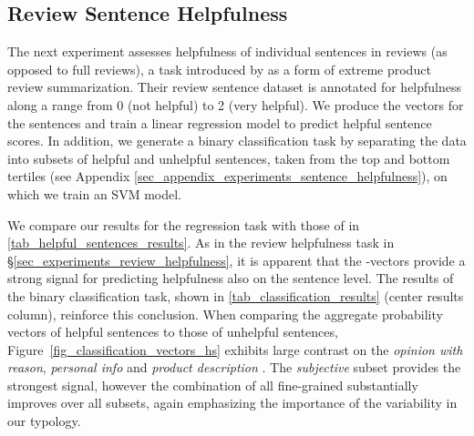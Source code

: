 





\subsection{Review Sentence Helpfulness}
\label{sec_experiments_sentence_helpfulness}

The next experiment assesses helpfulness of individual sentences in reviews (as opposed to full reviews), a task introduced by \citet{gamzu2021helpfulsentences}
as a form of extreme product review summarization.
Their review sentence dataset is annotated for helpfulness along a range from 0 (not helpful) to 2 (very helpful).
We produce the \taxtype{} vectors for the sentences and train a linear regression model to predict helpful sentence scores.
In addition, we generate a binary classification task by separating the data into subsets of helpful and unhelpful sentences, taken from the top and bottom tertiles (see Appendix \ref{sec_appendix_experiments_sentence_helpfulness}), on which we train an SVM model.

We compare our results for the regression task with those of \citet{gamzu2021helpfulsentences} in \autoref{tab_helpful_sentences_results}.
As in the review helpfulness task in \S{\ref{sec_experiments_review_helpfulness}}, it is apparent that the \taxtype{}-vectors provide a strong signal for predicting helpfulness also on the sentence level.
The results of the binary classification task, shown in \autoref{tab_classification_results} (center results column), reinforce this conclusion. %
When comparing the aggregate \taxtype{} probability vectors of helpful sentences to those of unhelpful sentences, Figure~\ref{fig_classification_vectors_hs} exhibits large contrast on the \textit{opinion with reason}, \textit{personal info} and \textit{product description} \taxtypes{}.
The \textit{subjective} \taxtype{} subset provides the strongest signal, however the combination of all fine-grained \taxtypes{} substantially improves over all subsets, again emphasizing the importance of the variability in our typology.



